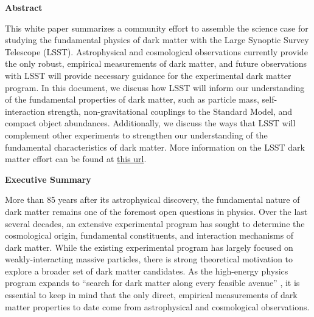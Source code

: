 
\begin{center}
  {\Large \bf Abstract}
\end{center}

This white paper summarizes a community effort to assemble the science case for studying the fundamental physics of dark matter with the Large Synoptic Survey Telescope (LSST). Astrophysical and cosmological observations currently provide the only robust, empirical measurements of dark matter, and future observations with LSST will provide necessary guidance for the experimental dark matter program. In this document, we discuss how LSST will inform our understanding of the fundamental properties of dark matter, such as particle mass, self-interaction strength, non-gravitational couplings to the Standard Model, and compact object abundances. Additionally, we discuss the ways that LSST will complement other experiments to strengthen our understanding of the fundamental characteristics of dark matter. More information on the LSST dark matter effort can be found at \href{https://lsstdarkmatter.github.io/}{this url}.
\clearpage


\begin{center}
  {\Large \bf Executive Summary}
\end{center}

More than 85 years after its astrophysical discovery, the fundamental nature of dark matter remains one of the foremost open questions in physics.
Over the last several decades, an extensive experimental program has sought to determine the cosmological origin, fundamental constituents, and interaction mechanisms of dark matter. 
While the existing experimental program has largely focused on weakly-interacting massive particles, there is strong theoretical motivation to explore a broader set of dark matter candidates.
As the high-energy physics program expands to ``search for dark matter along every feasible avenue'' \citep{P5Report}, it is essential to keep in mind that the only direct, empirical measurements of dark matter properties to date come from astrophysical and cosmological observations.



